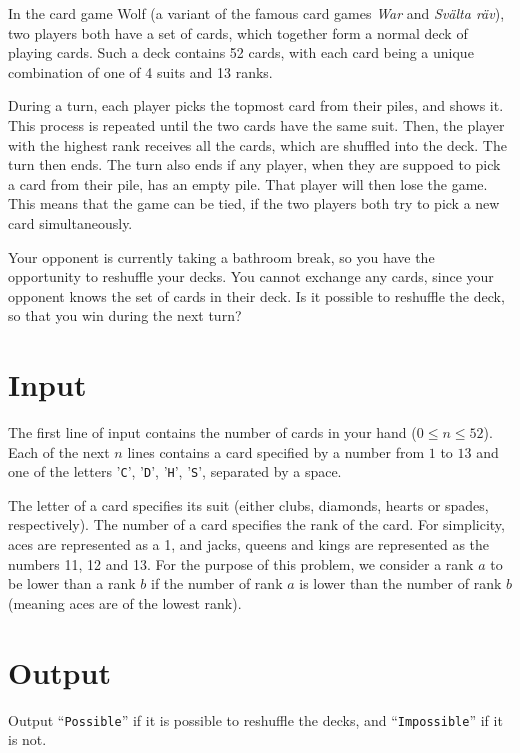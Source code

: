 
In the card game Wolf (a variant of the famous card games \emph{War} and \emph{Svälta räv}), two players both have a set of cards, which together
form a normal deck of playing cards.
Such a deck contains 52 cards, with each card being a unique combination of one of 4 suits and 13 ranks.

During a turn, each player picks the topmost card from their piles, and
shows it. This process is repeated until the two cards have the same suit.
Then, the player with the highest rank receives all the cards, which are
shuffled into the deck. The turn then ends.
The turn also ends if any player, when they are suppoed to pick a card from their pile, has an empty pile.
That player will then lose the game.
This means that the game can be tied, if the two players both try to pick a new card simultaneously.

Your opponent is currently taking a bathroom break, so you have the
opportunity to reshuffle your decks. You cannot exchange any cards, since
your opponent knows the set of cards in their deck. Is it possible to
reshuffle the deck, so that you win during the next turn?

\section*{Input}

The first line of input contains the number of cards in your hand
($0 \leq n \leq 52$). Each of the next $n$ lines contains a card
specified by a number from $1$ to $13$ and one of the letters
'\texttt{C}', '\texttt{D}', '\texttt{H}', '\texttt{S}', separated by a
space.

The letter of a card specifies its suit (either clubs, diamonds, hearts or spades, respectively).
The number of a card specifies the rank of the card.
For simplicity, aces are represented as a 1, and jacks, queens and kings are represented as the numbers 11, 12 and 13.
For the purpose of this problem, we consider a rank $a$ to be lower than a rank $b$ if the number of rank $a$ is lower than the number of rank $b$ (meaning aces are of the lowest rank).

\section*{Output}

Output ``\texttt{Possible}'' if it is possible to reshuffle the decks,
and ``\texttt{Impossible}'' if it is not.

